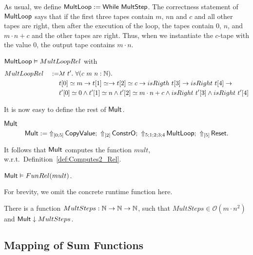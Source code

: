 As usual, we define $\MS{MultLoop} := \While~\MS{MultStep}$.  The correctness statement of $\MS{MultLoop}$ says that if the first three tapes contain
$m$, $n$n and $c$ and all other tapes are right, then after the execution of the loop, the tapes contain $0$, $n$, and $m \cdot n + c$ and the other
tapes are right.  Thus, when we instantiate the $c$-tape with the value $0$, the output tape contains $m \cdot n$.

\begin{lemma}
  \label{lem:Mult_Loop_Realise}
  \label{lem:Mult_Loop_Realise}
  $\MS{MultLoop} \Realise MultLoopRel$ with
  \begin{alignat*}{2}
    & MultLoopRel ~&:=& \lambda t~t'.~\forall (c~m~n:\Nat). \\
    &&& t[0] \simeq m \rightarrow t[1] \simeq \rightarrow t[2] \simeq c \rightarrow isRigth~t[3] \rightarrow isRight~t[4] \rightarrow \\
    &&& t'[0] \simeq 0 \land t'[1] \simeq n \land t'[2] \simeq m \cdot n + c \land isRight~t'[3] \land isRight~t'[4]
  \end{alignat*}
\end{lemma}

It is now easy to define the rest of $\MS{Mult}$.
\begin{definition}{$\MS{Mult}$}
  \label{def:Mult}
  \[
    \MS{Mult} :=
    \LiftTapes{\MS{CopyValue}}{\Vector{0;5}} \Seq
    \LiftTapes{\MS{ConstrO}}{\Vector{2}} \Seq
    \LiftTapes{\MS{MultLoop}}{5;1;2;3;4} \Seq
    \LiftTapes{\MS{Reset}}{\Vector{5}}.
  \]
\end{definition}

It follows that $\MS{Mult}$ computes the function $mult$, w.r.t.\ Definition~\ref{def:Computes2_Rel}.
\begin{lemma}
  \label{lem:Mult_Computes}
  $\MS{Mult} \Realise FunRel(mult)$.
\end{lemma}

For brevity,  we omit the concrete runtime function here.  
\begin{lemma}
  There is a function $MultSteps : \Nat\to\Nat\to\Nat$, such that $MultSteps \in \mathcal{O}(m \cdot n^2)$ and $\MS{Mult} \TerminatesIn MultSteps$.
\end{lemma}

\subsection{Mapping of Sum Functions}
\label{sec:SumTM}


